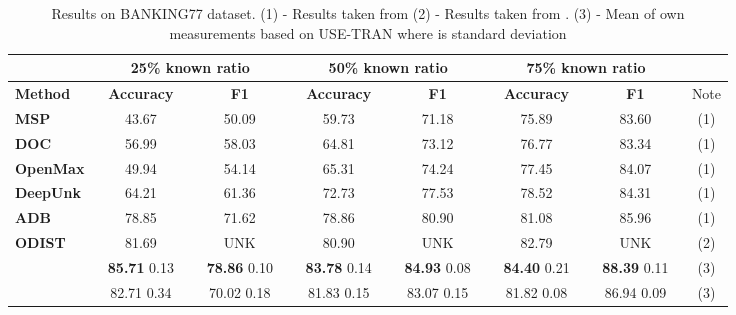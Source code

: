\documentclass[runningheads]{llncs}
\begin{document}
\begin{table}[t]
\caption{Results on BANKING77 dataset. (1) - Results taken from \cite{zhang2021adaptive_decision_boundary} (2) - Results taken from \cite{odist}. (3) - Mean of own measurements based on USE-TRAN where  is standard deviation}
\label{tab:banking_result}
\centering
\begin{adjustbox}{width=1\textwidth}
\begin{tabular}{l|cc|cc|cc|c}
                            & \multicolumn{2}{c|}{25\% known ratio}       & \multicolumn{2}{c|}{50\% known ratio}       & \multicolumn{2}{c|}{75\% known ratio}       &      \\ \hline
\textbf{Method}             & \textbf{Accuracy}    & \textbf{F1}          & \textbf{Accuracy}    & \textbf{F1}          & \textbf{Accuracy}    & \textbf{F1}          & Note \\ \hline
\textbf{MSP}                & 43.67                & 50.09                & 59.73                & 71.18                & 75.89                & 83.60                & (1)  \\
\textbf{DOC}                & 56.99                & 58.03                & 64.81                & 73.12                & 76.77                & 83.34                & (1)  \\
\textbf{OpenMax}            & 49.94                & 54.14                & 65.31                & 74.24                & 77.45                & 84.07                & (1)  \\
\textbf{DeepUnk}            & 64.21                & 61.36                & 72.73                & 77.53                & 78.52                & 84.31                & (1)  \\
\textbf{ADB}                & 78.85                & 71.62                & 78.86                & 80.90                & 81.08                & 85.96                & (1)  \\
\textbf{ODIST}              & 81.69                &      UNK                 & 80.90                &              UNK        & 82.79                &                 UNK     & (2)  \\ \hline
    & \,\,  \textbf{85.71}  0.13 \,\, &\,\,   \textbf{78.86}  0.10 \,\,  & \,\,  \textbf{83.78}   0.14 \,\, & \,\,  \textbf{84.93}   0.08 \,\, & \,\,  \textbf{84.40}   0.21 \,\, & \,\,    \textbf{88.39}   0.11 \,\, & (3)  \\
 & \,\,  82.71   0.34 \,\, & \,\, 70.02    0.18 \,\, & \,\,  81.83   0.15 \,\,  & \,\,    83.07   0.15 \,\, & \,\,   81.82   0.08 \,\,  & \,\,   86.94   0.09 \,\, & (3) 
\end{tabular}
\end{adjustbox}
\end{table}
\end{document}
